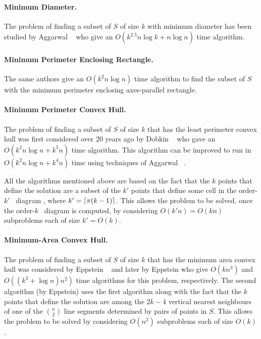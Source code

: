 \documentclass[lotsofwhite]{patmorin}
\begin{document}
\paragraph{Minimum Diameter.} The problem of finding a subset of $S$ of size
$k$ with minimum diameter has been studied by Aggarwal \etal\
\cite{aiks89} who give an $O(k^{2.5}n\log k+n\log n)$ time algorithm.

\paragraph{Minimum Perimeter Enclosing Rectangle.} The same authors
\cite{aiks89} give an $O(k^2n\log n)$ time algorithm to find the
subset of $S$ with the minimum perimeter enclosing axes-parallel
rectangle.

\paragraph{Minimum Perimeter Convex Hull.} The problem of finding a
subset of $S$ of size $k$ that has the least perimeter convex hull was
first considered over 20 years ago by Dobkin \etal\ \cite{ddg83} who
gave an $O(k^2n\log n + k^5 n)$ time algorithm.  This algorithm can be
improved to run in $O(k^2 n\log n + k^4 n)$ time using techniques of
Aggarwal \etal\ \cite{aiks89}.  

All the algorithms mentioned above are based on the fact that the $k$
points that define the solution are a subset of the $k'$ points that
define some cell in the order-$k'$ \voronoi\ diagram \cite{obsXX},
where $k'=\left\lceil \pi (k-1) \right\rceil$.  This allows the problem to be solved,
once the order-$k$ \voronoi\ diagram is computed, by considering
$O(k'n)=O(kn)$ subproblems each of size $k'=O(k)$.

\paragraph{Minimum-Area Convex Hull.}  The problem of finding a subset
of $S$ of size $k$ that has the minimum area convex hull was
considered by Eppstein \etal\ \cite{eorw92} and later by Eppstein
\cite{e93} who give $O(kn^{3})$ and $O((k^3+\log n) n^2)$ time
algorithms for this problem, respectively.  The second algorithm (by
Eppstein) uses the first algorithm along with the fact that the $k$
points that define the solution are among the $2k-4$ vertical nearest
neighbours of one of the $n\choose 2$ line segments determined by
pairs of points in $S$.  This allows the problem to be solved by
considering $O(n^2)$ subproblems each of size $O(k)$.
\end{document}
